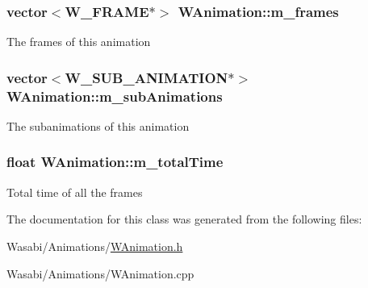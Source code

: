 \subsubsection[{\texorpdfstring{m\+\_\+frames}{m_frames}}]{\setlength{\rightskip}{0pt plus 5cm}vector$<${\bf W\+\_\+\+F\+R\+A\+ME}$\ast$$>$ W\+Animation\+::m\+\_\+frames\hspace{0.3cm}{\ttfamily [protected]}}\hypertarget{class_w_animation_adee42ca012501f00569e58277a5bf708}{}\label{class_w_animation_adee42ca012501f00569e58277a5bf708}
The frames of this animation 
\subsubsection[{\texorpdfstring{m\+\_\+sub\+Animations}{m_subAnimations}}]{\setlength{\rightskip}{0pt plus 5cm}vector$<${\bf W\+\_\+\+S\+U\+B\+\_\+\+A\+N\+I\+M\+A\+T\+I\+ON}$\ast$$>$ W\+Animation\+::m\+\_\+sub\+Animations\hspace{0.3cm}{\ttfamily [protected]}}\hypertarget{class_w_animation_ac8bd5b9f5b8ddae1a8658a169e0cbf51}{}\label{class_w_animation_ac8bd5b9f5b8ddae1a8658a169e0cbf51}
The subanimations of this animation 
\subsubsection[{\texorpdfstring{m\+\_\+total\+Time}{m_totalTime}}]{\setlength{\rightskip}{0pt plus 5cm}float W\+Animation\+::m\+\_\+total\+Time\hspace{0.3cm}{\ttfamily [protected]}}\hypertarget{class_w_animation_a0a819e66ae3c7aed6fae97482c3a8281}{}\label{class_w_animation_a0a819e66ae3c7aed6fae97482c3a8281}
Total time of all the frames 

The documentation for this class was generated from the following files\+:\begin{DoxyCompactItemize}
\item 
Wasabi/\+Animations/\hyperlink{_w_animation_8h}{W\+Animation.\+h}\item 
Wasabi/\+Animations/W\+Animation.\+cpp\end{DoxyCompactItemize}
